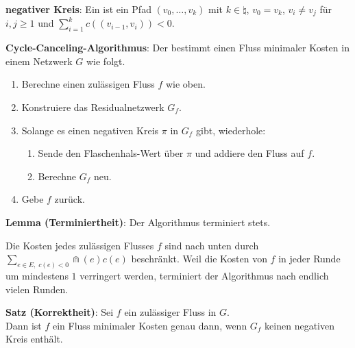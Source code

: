 \textbf{negativer Kreis}:
Ein  ist ein Pfad $(v_0, \dotsc, v_k)$ mit
$k \in \natural$,
$v_0 = v_k$, $v_i \not= v_j$ für $i, j \ge 1$ und $\sum_{i=1}^k c((v_{i-1}, v_i)) < 0$.


\textbf{Cycle-Canceling-Algorithmus}:
Der 
bestimmt einen Fluss minimaler Kosten in einem Netzwerk $G$ wie folgt.
\begin{enumerate}
    \item
    Berechne einen zulässigen Fluss $f$ wie oben.
    
    \item
    Konstruiere das Residualnetzwerk $G_f$.
    
    \item
    Solange es einen negativen Kreis $\pi$ in $G_f$ gibt, wiederhole:
    \begin{enumerate}
        \item
        Sende den Flaschenhals-Wert über $\pi$ und addiere den Fluss auf $f$.
        
        \item
        Berechne $G_f$ neu.
    \end{enumerate}
    
    \item
    Gebe $f$ zurück.
\end{enumerate}

\linie

\textbf{Lemma (Terminiertheit)}:
Der Algorithmus terminiert stets.

\begin{Beweis}
    Die Kosten jedes zulässigen Flusses $f$ sind nach unten durch
    $\sum_{e \in E,\; c(e) < 0} \Cap(e) c(e)$ beschränkt.
    Weil die Kosten von $f$ in jeder Runde um mindestens $1$ verringert werden,
    terminiert der Algorithmus nach endlich vielen Runden.
\end{Beweis}

\linie

\textbf{Satz (Korrektheit)}:
Sei $f$ ein zulässiger Fluss in $G$.\\
Dann ist $f$ ein Fluss minimaler Kosten genau dann, wenn $G_f$ keinen negativen Kreis enthält.

